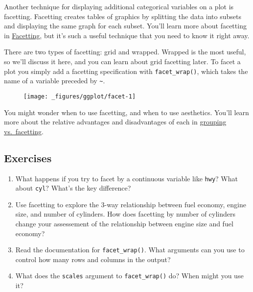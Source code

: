 Another technique for displaying additional categorical variables on a
plot is facetting. Facetting creates tables of graphics by splitting the
data into subsets and displaying the same graph for each subset. You'll
learn more about facetting in \hyperref[sec:facetting]{Facetting}, but
it's such a useful technique that you need to know it right away.

There are two types of facetting: grid and wrapped. Wrapped is the most
useful, so we'll discuss it here, and you can learn about grid facetting
later. To facet a plot you simply add a facetting specification with
\texttt{facet\_wrap()}, which takes the name of a variable preceded by
\texttt{\textasciitilde{}}. 

\begin{Shaded}
\begin{Highlighting}[]
\StringTok{ }
\StringTok{  }\NormalTok{() +}\StringTok{ }
\StringTok{  }
\end{Highlighting}
\end{Shaded}

\begin{figure}[H]
  \texttt{[image: \_figures/ggplot/facet-1]}
\end{figure}

You might wonder when to use facetting, and when to use aesthetics.
You'll learn more about the relative advantages and disadvantages of
each in \hyperref[sub:group-vs-facet]{grouping vs.~facetting}.

\subsection{Exercises}

\begin{enumerate}
\def\labelenumi{\arabic{enumi}.}
\item
  What happens if you try to facet by a continuous variable like
  \texttt{hwy}? What about \texttt{cyl}? What's the key difference?
\item
  Use facetting to explore the 3-way relationship between fuel economy,
  engine size, and number of cylinders. How does facetting by number of
  cylinders change your assessement of the relationship between engine
  size and fuel economy?
\item
  Read the documentation for \texttt{facet\_wrap()}. What arguments can
  you use to control how many rows and columns in the output?
\item
  What does the \texttt{scales} argument to \texttt{facet\_wrap()} do?
  When might you use it?
\end{enumerate}

